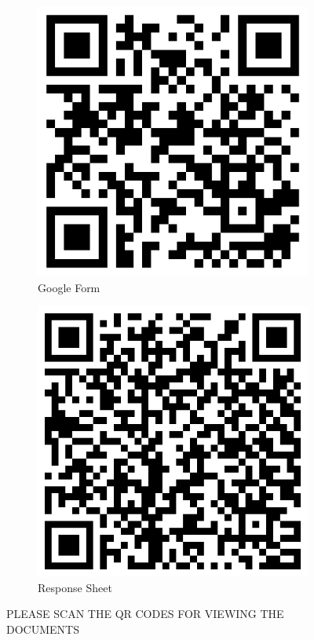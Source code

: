 \begin{figure}[h!]
	\begin{subfigure}{0.5\textwidth}
		\centering
		\includegraphics[width=0.63\linewidth]{IMAGES/FORM.png}
		\caption*{\centering Google Form}
	\end{subfigure}%
	\begin{subfigure}{0.5\textwidth}
		\centering
		\includegraphics[width=0.63\linewidth]{IMAGES/RESPONSE.png}
		\caption*{\centering Response Sheet}
	\end{subfigure}
	\caption*{\centering PLEASE SCAN THE QR CODES FOR VIEWING THE DOCUMENTS}
\end{figure}
